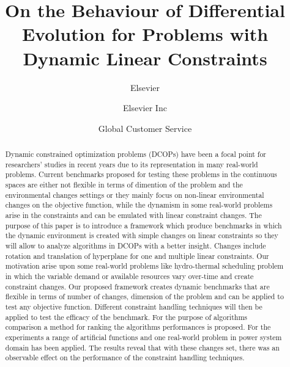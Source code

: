 \documentclass[review]{elsarticle}
\begin{document}
\begin{frontmatter}

\title{On the Behaviour of Differential Evolution for Problems with Dynamic Linear Constraints}

\author{Elsevier}
\address{Radarweg 29, Amsterdam}

\author[mymainaddress,mysecondaryaddress]{Elsevier Inc}

\author[mysecondaryaddress]{Global Customer Service}

\address[mymainaddress]{1600 John F Kennedy Boulevard, Philadelphia}
\address[mysecondaryaddress]{360 Park Avenue South, New York}



\begin{abstract}
Dynamic constrained optimization problems (DCOPs) have been a focal point for researchers' studies in recent years due to its representation in many real-world problems. Current benchmarks proposed for testing these problems in the continuous spaces are either not flexible in terms of dimention of the problem and the environmental changes settings or they mainly focus on non-linear environmental changes on the objective function, while the dynamism in some real-world problems arise in the constraints and can be emulated with linear constraint changes. The purpose of this paper is to introduce a framework which produce benchmarks in which the dynamic environment is created with simple changes on linear constraints so they will allow to analyze algorithms in DCOPs with a better insight. Changes include rotation and translation of hyperplane for one and multiple linear constraints. Our motivation arise upon some real-world problems like hydro-thermal scheduling problem in which the variable demand or available resources vary over-time and create constraint changes.
Our proposed framework creates dynamic benchmarks that are flexible in terms of number of changes, dimension of the problem and can be applied to test any objective function. 
Different constraint handling techniques will then be applied to test the efficacy of the benchmark. For the purpose of algorithms comparison a method for ranking the algorithms performances is proposed. For the experiments a range of artificial functions and one real-world problem in power system domain has been applied.
The results reveal that with these changes set, there was an observable effect on the performance of the constraint handling techniques. 
\end{abstract}


\end{frontmatter}
\end{document}
